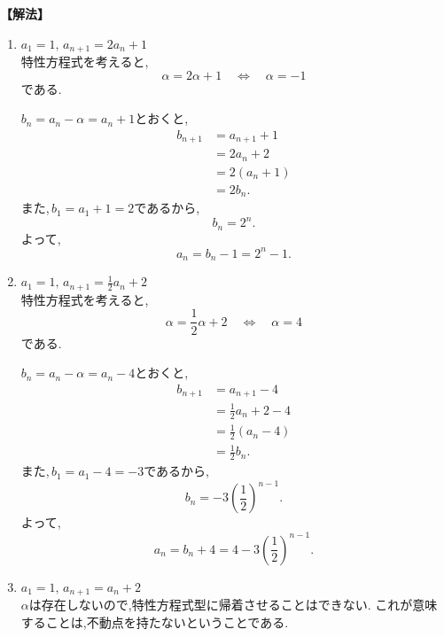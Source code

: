   \noindent\textbf{【解法】}
  \begin{enumerate}[label=(\arabic*),parsep=3pt]
    \item $\displaystyle a_1=1,\,a_{n+1}=2a_n+1$\\
          特性方程式を考えると,
          \[
            \alpha=2\alpha+1
            \quad\Longleftrightarrow\quad
            \alpha=-1
          \]
          である.

          $b_n=a_n-\alpha=a_n+1$とおくと,
          \begin{align*}
            b_{n+1}
              &=a_{n+1}+1\\
              &=2a_n+2\\
              &=2(a_n+1)\\
              &=2b_n.
          \end{align*}
          また,\,$b_1=a_1+1=2$であるから,
          \[
            b_n=2^n.
          \]
          よって,
          \[
            a_n=b_n-1=2^n-1.
          \]

    \item $\displaystyle a_1=1,\,a_{n+1}=\frac12a_n+2$\\
            特性方程式を考えると,
            \[
              \alpha=\frac12\alpha+2
              \quad\Longleftrightarrow\quad
              \alpha=4
            \]
            である.

            $b_n=a_n-\alpha=a_n-4$とおくと,
            \begin{align*}
              b_{n+1}
                &=a_{n+1}-4\\
                &=\frac12a_n+2-4\\
                &=\frac12(a_n-4)\\
                &=\frac12b_n.
            \end{align*}
            また,\,$b_1=a_1-4=-3$であるから,
            \[
              b_n=-3\left(\frac12\right)^{n-1}.
            \]
            よって,
            \[
              a_n=b_n+4
              =4-3\left(\frac12\right)^{n-1}.
            \]
     \item $\displaystyle a_1=1,\, a_{n+1}=a_n+2$\\
           $\alpha$は存在しないので,特性方程式型に帰着させることはできない.
           これが意味することは,不動点を持たないということである.
  \end{enumerate}

